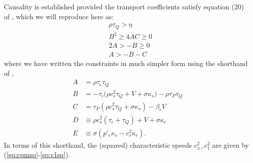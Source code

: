 \documentclass[%
notitlepage,
superscriptaddress,
nofootinbib,
amsmath,
amssymb,
aps,
twocolumn
]{revtex4-1}
\begin{document}
Causality is established provided the transport coefficients satisfy equation (20) of \cite{Bemfica:2020zjp}, which we will reproduce here as:
\begin{align}
&\rho \tau_{Q} > \eta \tag{CAUS A} \label{eq:CAUS_A}\\
&B^2 \geq 4 A C \geq 0 \tag{CAUS B} \label{eq:CAUS_B}\\
&2 A > -B \geq 0 \tag{CAUS C} \label{eq:CAUS_C}\\
&A > -B - C \tag{CAUS D} \label{eq:CAUS_D}
\end{align}
where we have written the constraints in much simpler form using the shorthand of \cite{Bemfica:2020zjp},
\begin{align}
A &= \rho \tau_{\epsilon} \tau_{Q} \label{eq:A}\\
B &= - \tau_{\epsilon} \Big( \rho c_s^2 \tau_{Q} + V + \sigma \kappa_{s} \Big) - \rho \tau_{P} \tau_{Q} \label{eq:B}\\
C &= \tau_{P} (\rho c_s^2 \tau_{Q} + \sigma \kappa_{s}) - \beta_{\epsilon} V \label{eq:C}\\
D &\equiv \rho c_s^2 (\tau_{\epsilon} + \tau_{Q}) + V + \sigma \kappa_{\epsilon} \\
E &\equiv \sigma (p'_{\epsilon} \kappa_{s} - c_s^2 \kappa_{\epsilon}).
\end{align}
In terms of this shorthand, the (squared) characteristic speeds $c_{\pm}^{2}, c_{1}^2$ are given by (\ref{eq:cpmsq}-\ref{eq:c1sq}).
\end{document}
